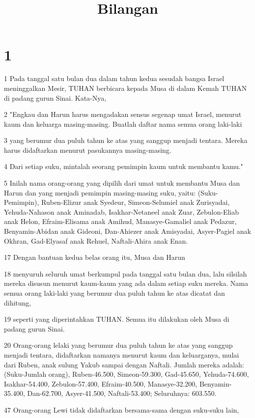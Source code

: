 

\title{Bilangan}


\chapter{1}

\par 1 Pada tanggal satu bulan dua dalam tahun kedua sesudah bangsa Israel meninggalkan Mesir, TUHAN berbicara kepada Musa di dalam Kemah TUHAN di padang gurun Sinai. Kata-Nya,
\par 2 "Engkau dan Harun harus mengadakan sensus segenap umat Israel, menurut kaum dan keluarga masing-masing. Buatlah daftar nama semua orang laki-laki
\par 3 yang berumur dua puluh tahun ke atas yang sanggup menjadi tentara. Mereka harus didaftarkan menurut pasukannya masing-masing.
\par 4 Dari setiap suku, mintalah seorang pemimpin kaum untuk membantu kamu."
\par 5 Inilah nama orang-orang yang dipilih dari umat untuk membantu Musa dan Harun dan yang menjadi pemimpin masing-masing suku, yaitu: (Suku-Pemimpin), Ruben-Elizur anak Syedeur, Simeon-Selumiel anak Zurisyadai, Yehuda-Nahason anak Aminadab, Isakhar-Netaneel anak Zuar, Zebulon-Eliab anak Helon, Efraim-Elisama anak Amihud, Manasye-Gamaliel anak Pedazur, Benyamin-Abidan anak Gideoni, Dan-Ahiezer anak Amisyadai, Asyer-Pagiel anak Okhran, Gad-Elyasaf anak Rehuel, Naftali-Ahira anak Enan.
\par 17 Dengan bantuan kedua belas orang itu, Musa dan Harun
\par 18 menyuruh seluruh umat berkumpul pada tanggal satu bulan dua, lalu silsilah mereka disusun menurut kaum-kaum yang ada dalam setiap suku mereka. Nama semua orang laki-laki yang berumur dua puluh tahun ke atas dicatat dan dihitung,
\par 19 seperti yang diperintahkan TUHAN. Semua itu dilakukan oleh Musa di padang gurun Sinai.
\par 20 Orang-orang lelaki yang berumur dua puluh tahun ke atas yang sanggup menjadi tentara, didaftarkan namanya menurut kaum dan keluarganya, mulai dari Ruben, anak sulung Yakub sampai dengan Naftali. Jumlah mereka adalah: (Suku-Jumlah orang), Ruben-46.500, Simeon-59.300, Gad-45.650, Yehuda-74.600, Isakhar-54.400, Zebulon-57.400, Efraim-40.500, Manasye-32.200, Benyamin-35.400, Dan-62.700, Asyer-41.500, Naftali-53.400; Seluruhnya: 603.550.
\par 47 Orang-orang Lewi tidak didaftarkan bersama-sama dengan suku-suku lain,
